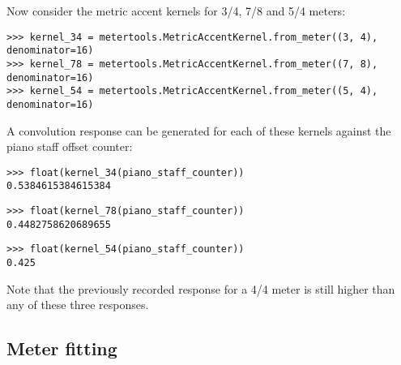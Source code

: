 \noindent Now consider the metric accent kernels for 3/4, 7/8 and 5/4 meters:

\begin{comment}
<abjad>
kernel_34 = metertools.MetricAccentKernel.from_meter((3, 4), denominator=16)
kernel_78 = metertools.MetricAccentKernel.from_meter((7, 8), denominator=16)
kernel_54 = metertools.MetricAccentKernel.from_meter((5, 4), denominator=16)
</abjad>
\end{comment}

\begin{singlespacing}
\vspace{-0.5\baselineskip}
\begin{lstlisting}
>>> kernel_34 = metertools.MetricAccentKernel.from_meter((3, 4), denominator=16)
>>> kernel_78 = metertools.MetricAccentKernel.from_meter((7, 8), denominator=16)
>>> kernel_54 = metertools.MetricAccentKernel.from_meter((5, 4), denominator=16)
\end{lstlisting}
\end{singlespacing}

\noindent A convolution response can be generated for each of these kernels
against the piano staff offset counter:

\begin{comment}
<abjad>
float(kernel_34(piano_staff_counter))
float(kernel_78(piano_staff_counter))
float(kernel_54(piano_staff_counter))
</abjad>
\end{comment}

\begin{singlespacing}
\vspace{-0.5\baselineskip}
\begin{lstlisting}
>>> float(kernel_34(piano_staff_counter))
0.5384615384615384
\end{lstlisting}
\begin{lstlisting}
>>> float(kernel_78(piano_staff_counter))
0.4482758620689655
\end{lstlisting}
\begin{lstlisting}
>>> float(kernel_54(piano_staff_counter))
0.425
\end{lstlisting}
\end{singlespacing}

\noindent Note that the previously recorded response for a 4/4 meter is still
higher than any of these three responses.

\subsection{Meter fitting} %

